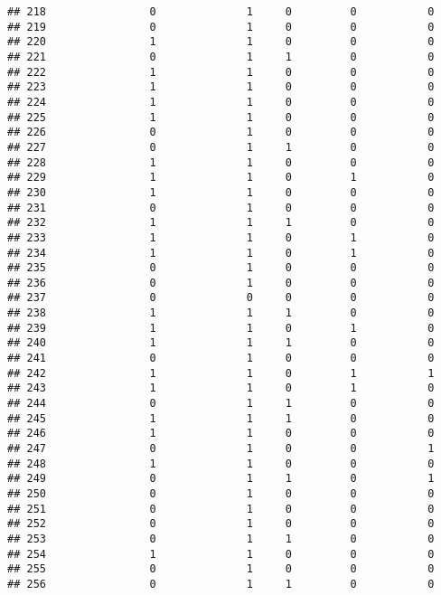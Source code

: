 \documentclass[]{article}
\begin{document}
\begin{verbatim}
## 218                0              1     0         0           0
## 219                0              1     0         0           0
## 220                1              1     0         0           0
## 221                0              1     1         0           0
## 222                1              1     0         0           0
## 223                1              1     0         0           0
## 224                1              1     0         0           0
## 225                1              1     0         0           0
## 226                0              1     0         0           0
## 227                0              1     1         0           0
## 228                1              1     0         0           0
## 229                1              1     0         1           0
## 230                1              1     0         0           0
## 231                0              1     0         0           0
## 232                1              1     1         0           0
## 233                1              1     0         1           0
## 234                1              1     0         1           0
## 235                0              1     0         0           0
## 236                0              1     0         0           0
## 237                0              0     0         0           0
## 238                1              1     1         0           0
## 239                1              1     0         1           0
## 240                1              1     1         0           0
## 241                0              1     0         0           0
## 242                1              1     0         1           1
## 243                1              1     0         1           0
## 244                0              1     1         0           0
## 245                1              1     1         0           0
## 246                1              1     0         0           0
## 247                0              1     0         0           1
## 248                1              1     0         0           0
## 249                0              1     1         0           1
## 250                0              1     0         0           0
## 251                0              1     0         0           0
## 252                0              1     0         0           0
## 253                0              1     1         0           0
## 254                1              1     0         0           0
## 255                0              1     0         0           0
## 256                0              1     1         0           0

\end{verbatim}
\end{document}
